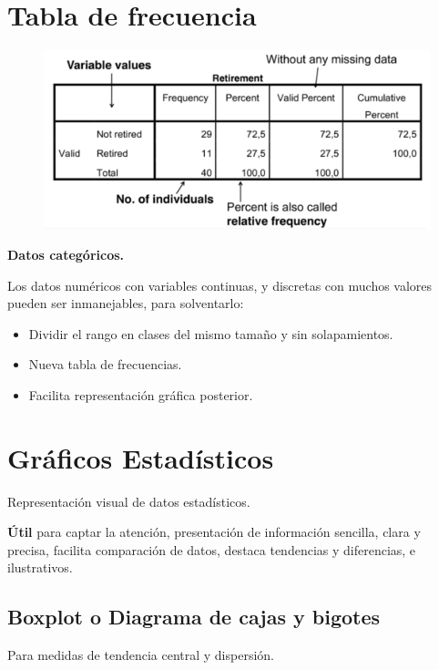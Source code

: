 \documentclass[12pt, twoside, openright]{report} %
\begin{document}
\section{Tabla de frecuencia}

\begin{figure}[H]
	{\includegraphics[scale=.5]{Untitled 3.png}}
\end{figure}

\textbf{Datos categóricos.}

Los datos numéricos con variables continuas, y discretas con muchos
valores pueden ser inmanejables, para solventarlo:

\begin{itemize}

\item
  Dividir el rango en clases del mismo tamaño y sin solapamientos.
\item
  Nueva tabla de frecuencias.
\item
  Facilita representación gráfica posterior.
\end{itemize}

\section{Gráficos Estadísticos}

Representación visual de datos estadísticos.

\textbf{Útil} para captar la atención, presentación de información
sencilla, clara y precisa, facilita comparación de datos, destaca
tendencias y diferencias, e ilustrativos.

\subsection{Boxplot o Diagrama de cajas y
bigotes}

Para medidas de tendencia central y dispersión.
\end{document}
